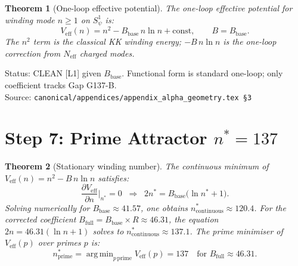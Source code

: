 \documentclass[12pt,a4paper]{article}
\newtheorem{theorem}{Theorem}[section]
\theoremstyle{definition}
\theoremstyle{remark}
\begin{document}
\begin{theorem}[One-loop effective potential]
\label{thm:ar:Veff}
The one-loop effective potential for winding mode $n \geq 1$ on $S^1_\psi$ is:
\begin{equation}
  V_{\mathrm{eff}}(n) = n^2 - B_{\mathrm{base}}\, n\ln n + \mathrm{const},
  \qquad B = B_{\mathrm{base}}.
  \label{eq:ar:Veff}
\end{equation}
The $n^2$ term is the classical KK winding energy; $-B\, n\ln n$ is the
one-loop correction from $N_{\mathrm{eff}}$ charged modes.
\end{theorem}

\begin{resultbox}
Status: CLEAN [L1] given $B_{\mathrm{base}}$.  Functional form is standard
one-loop; only coefficient tracks Gap G137-B.\\
Source: \texttt{canonical/appendices/appendix\_alpha\_geometry.tex \S3}
\end{resultbox}

\section{Step 7: Prime Attractor $n^* = 137$}
\label{sec:ar:nstar}

\begin{theorem}[Stationary winding number]
\label{thm:ar:nstar_stationary}
The continuous minimum of $V_{\mathrm{eff}}(n) = n^2 - B\,n\ln n$ satisfies:
\begin{equation}
  \frac{\partial V_{\mathrm{eff}}}{\partial n}\bigg|_{n^*} = 0
  \;\;\Longrightarrow\;\;
  2n^* = B_{\mathrm{base}}\bigl(\ln n^* + 1\bigr).
  \label{eq:ar:nstar_formula}
\end{equation}
Solving numerically for $B_{\mathrm{base}} \approx 41.57$, one obtains
$n^*_{\mathrm{continuous}} \approx 120.4$.
For the corrected coefficient $B_{\mathrm{full}} = B_{\mathrm{base}} \times R \approx 46.31$,
the equation $2n = 46.31(\ln n + 1)$ solves to $n^*_{\mathrm{continuous}} \approx 137.1$.
The prime minimiser of $V_{\mathrm{eff}}(p)$ over primes $p$ is:
\begin{equation}
  n^*_{\mathrm{prime}} = \operatorname{arg\,min}_{p\,\mathrm{prime}} V_{\mathrm{eff}}(p)
  = 137 \quad \text{for } B_{\mathrm{full}} \approx 46.31.
  \label{eq:ar:nstar_prime}
\end{equation}
\end{theorem}
\end{document}
